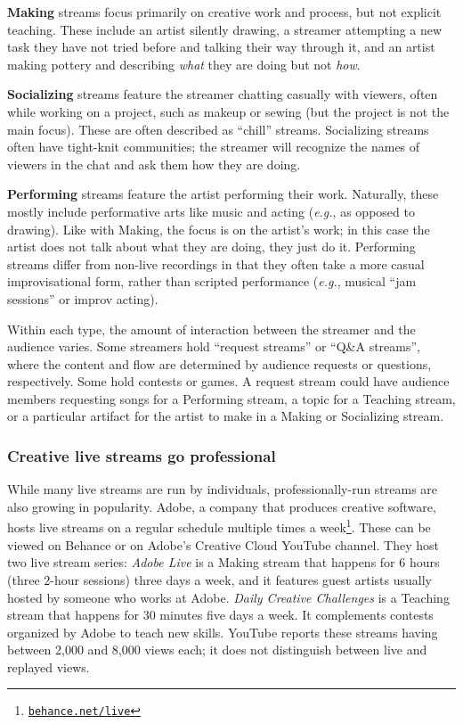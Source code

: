 \textbf{Making} streams focus primarily on creative work and process, but not explicit teaching. These include an artist silently drawing, a streamer attempting a new task they have not tried before and talking their way through it, and an artist making pottery and describing \textit{what} they are doing but not \textit{how}. 

\textbf{Socializing} streams feature the streamer chatting casually with viewers, often while working on a project, such as makeup or sewing (but the project is not the main focus). These are often described as ``chill'' streams. Socializing streams often have tight-knit communities; the streamer will recognize the names of viewers in the chat and ask them how they are doing.

\textbf{Performing} streams feature the artist performing their work. Naturally, these mostly include performative arts like music and acting (\textit{e.g.}, as opposed to drawing). Like with Making, the focus is on the artist's work; in this case the artist does not talk about what they are doing, they just do it. Performing streams differ from non-live recordings in that they often take a more casual improvisational form, rather than scripted performance (\textit{e.g.}, musical ``jam sessions'' or improv acting).

Within each type, the amount of interaction between the stream\-er and the audience varies. Some streamers hold ``request streams'' or ``Q\&A streams'', where the content and flow are determined by audience requests or questions, respectively. Some hold contests or games. A request stream could have audience members requesting songs for a Performing stream, a topic for a Teaching stream, or a particular artifact for the artist to make in a Making or Socializing stream. 

\subsubsection{Creative live streams go professional}
While many live streams are run by individuals, professionally-run streams are also growing in popularity. Adobe, a company that produces creative software, hosts live streams on a regular schedule multiple times a week\footnote{\href{https://behance.net/live}{\nolinkurl{behance.net/live}}}. These can be viewed on Behance or on Adobe's Creative Cloud YouTube channel. They host two live stream series: \textit{Adobe Live} is a Making stream that happens for 6 hours (three 2-hour sessions) three days a week, and it features guest artists usually hosted by someone who works at Adobe. \textit{Daily Creative Challenges} is a Teaching stream that happens for 30 minutes five days a week. It complements contests organized by Adobe to teach new skills. YouTube reports these streams having between 2,000 and 8,000 views each; it does not distinguish between live and replayed views.

